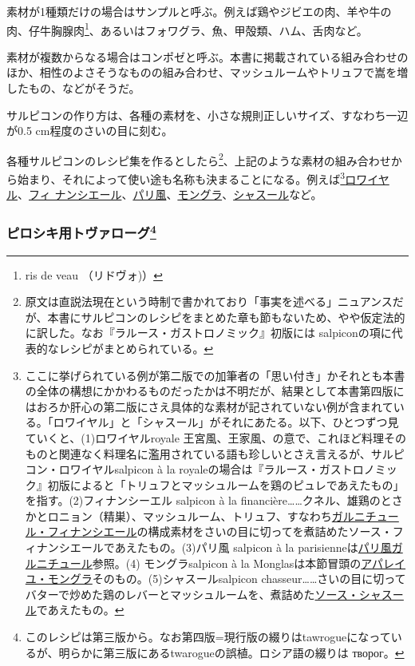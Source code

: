 \begin{recette}
素材が1種類だけの場合はサンプルと呼ぶ。例えば鶏やジビエの肉、羊や牛の肉、仔牛胸腺肉\footnote{ris
  de veau （リドヴォ)）}、あるいはフォワグラ、魚、甲殻類、ハム、舌肉など。

素材が複数からなる場合はコンポゼと呼ぶ。本書に掲載されている組み合わせのほか、相性のよさそうなものの組み合わせ、マッシュルームやトリュフで嵩を増したもの、などがそうだ。

サルピコンの作り方は、各種の素材を、小さな規則正しいサイズ、すなわち一辺が0.5
cm程度のさいの目に刻む。

各種サルピコンのレシピ集を作るとしたら\footnote{原文は直説法現在という時制で書かれており「事実を述べる」ニュアンスだが、本書にサルピコンのレシピをまとめた章も節もないため、やや仮定法的に訳した。なお『ラルース・ガストロノミック』初版には
  salpiconの項に代表的なレシピがまとめられている。}、上記のような素材の組み合わせから始まり、それによって使い途も名称も決まることになる。例えば\footnote{ここに挙げられている例が第二版での加筆者の「思い付き」かそれとも本書の全体の構想にかかわるものだったかは不明だが、結果として本書第四版にはおろか肝心の第二版にさえ具体的な素材が記されていない例が含まれている。「ロワイヤル」と「シャスール」がそれにあたる。以下、ひとつずつ見ていくと、(1)ロワイヤルroyale
  王宮風、王家風、の意で、これほど料理そのものと関連なく料理名に濫用されている語も珍しいとさえ言えるが、サルピコン・ロワイヤルsalpicon
  à la
  royaleの場合は『ラルース・ガストロノミック』初版によると「トリュフとマッシュルームを鶏のピュレであえたもの」を指す。(2)フィナンシーエル
  salpicon à la
  financière\ldots{}\ldots{}クネル、雄鶏のとさかとロニョン（精巣）、マッシュルーム、トリュフ、すなわち\protect\hyperlink{garniture-a-la-financiere}{ガルニチュール・フィナンシエール}の構成素材をさいの目に切ってを煮詰めたソース・フィナンシエールであえたもの。(3)パリ風
  salpicon à la
  parisienneは\protect\hyperlink{garniture-parisienne}{パリ風ガルニチュール}参照。(4)
  モングラsalpicon à la
  Monglasは本節冒頭の\protect\hyperlink{appareil-montglas}{アパレイユ・モングラ}そのもの。(5)シャスールsalpicon
  chasseur\ldots{}\ldots{}さいの目に切ってバターで炒めた鶏のレバーとマッシュルームを、煮詰めた\protect\hyperlink{sauce-chasseur}{ソース・シャスール}であえたもの。}\ul{ロワイヤル}、\ul{フィ
ナンシエール}、\ul{パリ風}、\ul{モングラ}、\ul{シャスール}など。

\atoaki{}

\hypertarget{ux30d4ux30edux30b7ux30adux7528ux30c8ux30f4ux30a1ux30edux30fcux30b072}{%
\subsubsection[ピロシキ用トヴァローグ]{\texorpdfstring{ピロシキ用トヴァローグ\footnote{このレシピは第三版から。なお第四版=現行版の綴りはtawrogueになっているが、明らかに第三版にあるtwarogueの誤植。ロシア語の綴りは
  творог。}}{ピロシキ用トヴァローグ}}\label{ux30d4ux30edux30b7ux30adux7528ux30c8ux30f4ux30a1ux30edux30fcux30b072}}


\end{recette}
